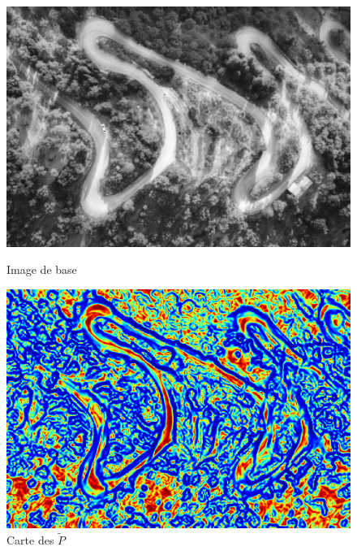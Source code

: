 \documentclass{article}
\begin{document}
\begin{figure}[h!]
    \centering
    \begin{minipage}{0.24\textwidth}
        \centering
        \includegraphics[width=\linewidth]{result_image/Image_4/1.png}
        \caption*{\small Image de base}
    \end{minipage}\hfill
    \begin{minipage}{0.24\textwidth}
        \centering
        \includegraphics[width=\linewidth]{result_image/Image_4/2.png}
        \caption*{\small Carte des $\tilde{P}$}
    \end{minipage}\hfill
    \begin{minipage}{0.24\textwidth}
        \centering

\end{minipage}
\end{figure}
\end{document}
